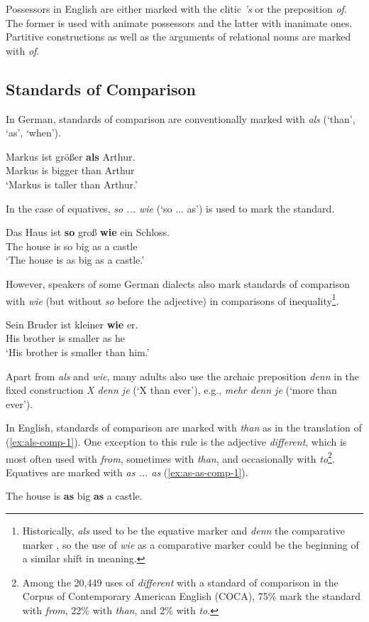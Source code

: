 \documentclass[lucida]{sp} %
\begin{document}
Possessors in English are either marked with the clitic \textit{'s} or the preposition \textit{of}. The former is used with animate possessors and the latter with inanimate ones. Partitive constructions as well as the arguments of relational nouns are marked with \textit{of}.

\subsection{Standards of Comparison}

In German, standards of comparison are conventionally marked with \textit{als} (`than', `{as}', `{when}').
\begin{exe}
\ex \label{ex:als-comp-1} \gll  Markus ist größer \textbf{als} Arthur.  \\ 
Markus is bigger than Arthur \\
`Markus is taller than Arthur.'
\end{exe}
In the case of equatives, \textit{so ... wie} (`so ... as') is used to mark the standard.
\begin{exe}
\ex \label{ex:so-wie-comp-1} \gll Das Haus ist \textbf{so} groß \textbf{wie} ein Schloss.  \\ 
The house is so big as a castle \\
`The house is as big as a castle.'
\end{exe}
However,  speakers of some German dialects also mark standards of comparison with \textit{wie} (but without \textit{so} before the adjective) in comparisons of inequality\footnote{Historically, \textit{als} used to be the equative marker and \textit{denn} the comparative marker \citep{thurmair2001}, so the use of \textit{wie} as a comparative marker could be the beginning of a similar shift in meaning.}. 

\begin{exe}
\ex \label{ex:wie-comp-1} \gll Sein Bruder ist kleiner \textbf{wie} er.  \\ 
His brother is smaller as he \\
`His brother is smaller than him.'
\end{exe}
Apart from \textit{als} and \textit{wie}, many adults also use the archaic preposition \textit{denn} in the fixed construction \textit{X denn je} (`X than ever'), e.g., \textit{mehr denn je} (`more than ever').

In English, standards of comparison are marked with \textit{than} as in the translation of (\ref{ex:als-comp-1}). One exception to this rule is the adjective \textit{different}, which is most often used with \textit{from}, sometimes with \textit{than}, and occasionally with \textit{to}\footnote{Among the 20,449 uses of \textit{different} with a standard of comparison in the Corpus of Contemporary American English (COCA), 75\% mark the standard with \textit{from}, 22\% with \textit{than}, and 2\% with \textit{to}.}. Equatives are marked with \textit{as ... as} (\ref{ex:as-as-comp-1}).
\begin{exe}
\ex  \label{ex:as-as-comp-1} The house is \textbf{as} big \textbf{as} a castle.
\end{exe}
\end{document}
